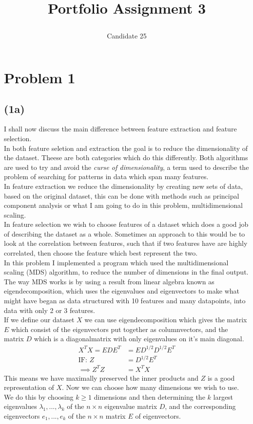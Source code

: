 \documentclass[12pt, letterpaper]{article}
\title{ \begin{huge}
\textbf{Portfolio Assignment 3}
\end{huge} }
\author{Candidate 25}
\date{}
\begin{document}
\maketitle
  \section*{Problem 1}
    \subsection*{(1a)}
      I shall now discuss the main difference between feature extraction and feature selection.\\

      In both feature seletion and extraction the goal is to reduce the dimensionality of the dataset. Theese are both categories which do this differently. Both algorithms are used to try and avoid the \textit{curse of dimensionality}, a term used to describe the problem of searching for patterns in data which span many features.\\
      In feature extraction we reduce the dimensionality by creating new sets of data, based on the original dataset, this can be done with methods such as principal component analysis or what I am going to do in this problem, multidimensional scaling.\\
      In feature selection we wish to choose features of a dataset which does a good job of describing the dataset as a whole. Sometimes an approach to this would be to look at the correlation between features, such that if two features have are highly correlated, then choose the feature which best represent the two.\\

      In this problem I implemented a program which used the multidimensional scaling (MDS) algorithm, to reduce the number of dimensions in the final output. The way MDS works is by using a result from linear algebra known as eigendecomposition, which uses the eigenvalues and eigenvectors to make what might have began as data structured with 10 features and many datapoints, into data with only 2 or 3 features.\\
      If we define our dataset $X$ we can use eigendecomposition which gives the matrix $E$ which consist of the eigenvectors put together as columnvectors, and the matrix $D$ which is a diagonalmatrix with only eigenvalues on it's main diagonal.
      \begin{align*}
        X^T X = EDE^T &= ED^{1/2}D^{1/2}E^T\\
        \text{IF: } Z &= D^{1/2}E^T\\
        \implies Z^T Z &= X^T X
      \end{align*}
      This means we have maximally preserved the inner products and $Z$ is a good representation of $X$. Now we can choose how many dimensions we wish to use. We do this by choosing $k \geq 1$ dimensions and then determining the $k$ largest eigenvalues $\lambda_1, ..., \lambda_k$ of the $n \times n$ eigenvalue matrix $D$, and the corresponding eigenvectors $e_1, ..., e_k$ of the $n \times n$ matrix $E$ of eigenvectors.
\end{document}
